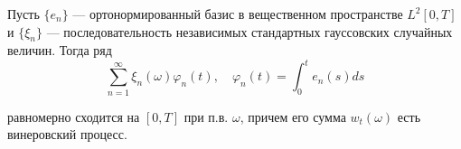 \begin{theorem}
    Пусть $\{e_n\}$ — ортонормированный базис в вещественном пространстве $L^2[0, T]$ и $\{\xi_n\}$ — последовательность независимых стандартных гауссовских случайных величин. Тогда ряд 
    \[ \sum_{n=1}^\infty \xi_n(\omega)\varphi_n(t), \quad \varphi_n(t) = \int_0^t e_n(s) ds \]
    
    равномерно сходится на $[0, T]$ при п.в. $\omega$, причем его сумма $w_t(\omega)$ есть винеровский процесс.
\end{theorem}